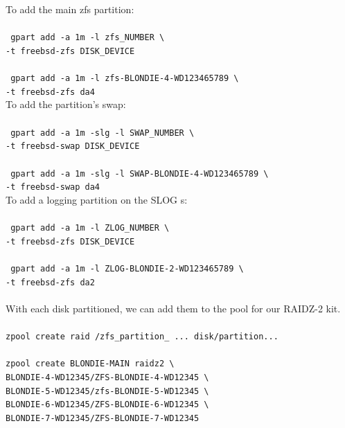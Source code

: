 To add the main \gls{zfs} \gls{partition}:\\\\
\texttt{ gpart add -a 1m -l \gls{zfs}\_NUMBER \textbackslash\\ -t freebsd-zfs DISK\_DEVICE}\\\\
\texttt{ gpart add -a 1m -l \gls{zfs}-BLONDIE-4-WD123465789 \textbackslash\\-t freebsd-zfs  da4}
\\

To add the \gls{partition}'s swap:\\\\
\texttt{ gpart add -a 1m -slg -l SWAP\_NUMBER \textbackslash\\-t freebsd-swap DISK\_DEVICE}\\\\
\texttt{ gpart add -a 1m -slg -l SWAP-BLONDIE-4-WD123465789 \textbackslash\\-t freebsd-swap da4}
\\

To add a logging \gls{partition} on the SLOG s:\\\\
\texttt{ gpart add -a 1m -l ZLOG\_NUMBER  \textbackslash\\-t freebsd-zfs DISK\_DEVICE}\\\\
\texttt{ gpart add -a 1m -l ZLOG-BLONDIE-2-WD123465789 \textbackslash\\-t freebsd-zfs  da2}\\\\

With each disk partitioned, we can add them to the pool for our RAIDZ-2 kit.\\\\
\texttt{zpool create \gls{raid}  /\gls{zfs}\_\gls{partition}\_ ... disk/\gls{partition}...}\\\\

\noindent\texttt{zpool create BLONDIE-MAIN raidz2 \textbackslash }\\
\texttt{BLONDIE-4-WD12345/ZFS-BLONDIE-4-WD12345 \textbackslash }\\
\texttt{BLONDIE-5-WD12345/\gls{zfs}-BLONDIE-5-WD12345 \textbackslash }\\
\texttt{BLONDIE-6-WD12345/ZFS-BLONDIE-6-WD12345 \textbackslash }\\
\texttt{BLONDIE-7-WD12345/ZFS-BLONDIE-7-WD12345 }\\

